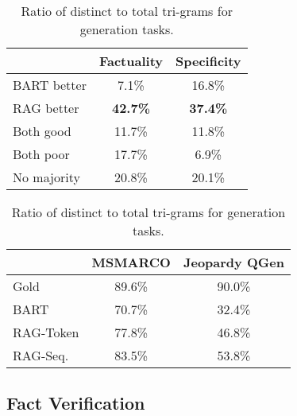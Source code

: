 \documentclass{article}
\begin{document}
\begin{table}[t]
\begin{minipage}[b]{0.49\linewidth}
\centering
\small
\caption{Human assessments for the Jeopardy Question Generation Task.}
\vspace{5pt}
    \begin{tabular}{lcc}
    \toprule
    &  Factuality & Specificity \\
    \midrule
    BART better & 7.1\% & 16.8\%\\
    RAG better & \textbf{42.7\%} & \textbf{37.4\%} \\
    Both good & 11.7\% & 11.8\%\\
    Both poor & 17.7\% & 6.9\% \\
    No majority & 20.8\% & 20.1\% \\
    \bottomrule
    \end{tabular}
    
    \label{tab:jeopardy}
\end{minipage}
\hspace{0.01\linewidth}
\begin{minipage}[b]{0.49\linewidth}
\centering
 \small
\caption{Ratio of distinct to total tri-grams  for generation tasks.}
\vspace{10pt}
    \begin{tabular}{lcc}
    \toprule
    &   \multicolumn{1}{m{2cm}}{\centering MSMARCO} &  \multicolumn{1}{m{2cm}}{\centering Jeopardy QGen} \\
    \midrule
    Gold  & 89.6\% & 90.0\%\\
    BART  & 70.7\% & 32.4\%\\
    RAG-Token & 77.8\% & 46.8\%\\
    RAG-Seq. & 83.5\% & 53.8\%\\
    \bottomrule
    \end{tabular}

    \label{tab:diversity}
\end{minipage}
\end{table}


\subsection{Fact Verification}
\end{document}
